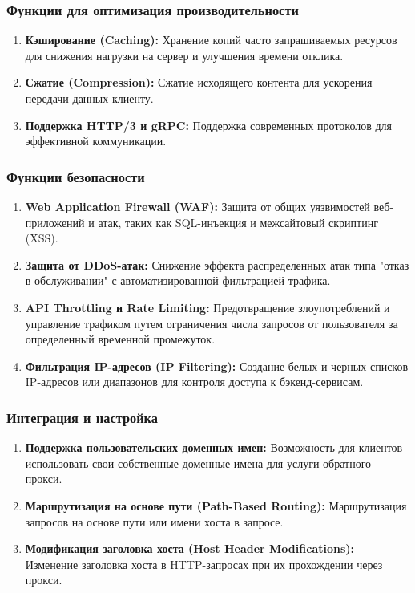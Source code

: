 \documentclass[14pt, a4paper]{extarticle}
\begin{document}
\subsubsection*{Функции для оптимизация производительности}

\begin{enumerate}
\item \textbf{Кэширование (Caching):} Хранение копий часто запрашиваемых ресурсов для снижения нагрузки на сервер и улучшения времени отклика.
\item \textbf{Сжатие (Compression):} Сжатие исходящего контента для ускорения передачи данных клиенту.
\item \textbf{Поддержка HTTP/3 и gRPC:} Поддержка современных протоколов для эффективной коммуникации.
\end{enumerate}

\subsubsection*{Функции безопасности}

\begin{enumerate}
\item \textbf{Web Application Firewall (WAF):} Защита от общих уязвимостей веб-приложений и атак, таких как SQL-инъекция и межсайтовый скриптинг (XSS).
\item \textbf{Защита от DDoS-атак:} Снижение эффекта распределенных атак типа "отказ в обслуживании" с автоматизированной фильтрацией трафика.
\item \textbf{API Throttling и Rate Limiting:} Предотвращение злоупотреблений и управление трафиком путем ограничения числа запросов от пользователя за определенный временной промежуток.
\item \textbf{Фильтрация IP-адресов (IP Filtering):} Создание белых и черных списков IP-адресов или диапазонов для контроля доступа к бэкенд-сервисам.
\end{enumerate}

\subsubsection*{Интеграция и настройка}

\begin{enumerate}
\item \textbf{Поддержка пользовательских доменных имен:} Возможность для клиентов использовать свои собственные доменные имена для услуги обратного прокси.
\item \textbf{Маршрутизация на основе пути (Path-Based Routing):} Маршрутизация запросов на основе пути или имени хоста в запросе.
\item \textbf{Модификация заголовка хоста (Host Header Modifications):} Изменение заголовка хоста в HTTP-запросах при их прохождении через прокси.
\end{enumerate}
\end{document}
